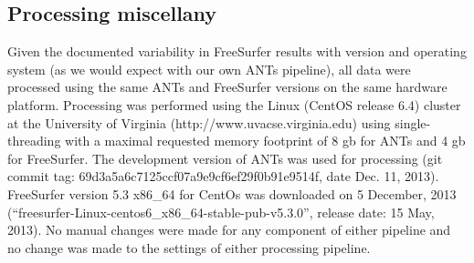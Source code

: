 \subsection{Processing miscellany}

Given the documented variability in FreeSurfer results with version and
operating system \citep{gronenschild2012} (as we would expect with our own ANTs pipeline),
all data were processed using the same ANTs and FreeSurfer versions on the same 
hardware platform.  Processing was performed using the Linux (CentOS release 6.4) 
cluster at the University 
of Virginia (http://www.uvacse.virginia.edu)
using single-threading with a maximal requested memory footprint of 8 gb for ANTs 
and 4 gb for FreeSurfer.  The development version of ANTs was used for processing 
(git commit tag: 69d3a5a6c7125ccf07a9e9cf6ef29f0b91e9514f, date Dec. 11, 2013).  
FreeSurfer version 5.3 x86\_64 for CentOs was downloaded 
on 5 December, 2013 (``freesurfer-Linux-centos6\_x86\_64-stable-pub-v5.3.0'', release
date: 15 May, 2013).   {\color{blue}{The brain extraction and segmentation results from both 
pipelines were visually inspected to screen for major problems.}}
No manual changes were made for any component of either pipeline and no change was made to the settings of either processing pipeline.



